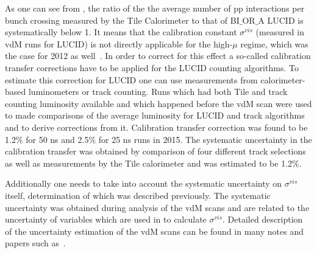 As one can see from , the ratio of the the average number of pp interactions per bunch crossing
measured by the Tile Calorimeter to that of BI$\_$OR$\_$A LUCID is systematically below 1. 
It means that the calibration constant $\sigma^{vis}$ (measured in vdM runs for LUCID) is not directly applicable for the high-$\mu$ regime, 
which was the case for 2012 as well~\cite{Aaboud:2016hhf}.
In order to correct for this effect a so-called calibration transfer corrections have to be applied for the LUCID counting algorithms.
To estimate this correction for LUCID one can use measurements from calorimeter-based luminometers or track counting.
Runs which had both Tile and track counting luminosity available and which happened before the vdM scan were used to made comparisons of the average luminosity for LUCID and track algorithms
and to derive corrections from it. Calibration transfer correction was found to be 1.2$\%$ for 50 ns and 2.5$\%$ for 25 ns runs in 2015.
The systematic uncertainty in the calibration transfer was obtained by comparison of four different track selections as well as measurements by the Tile calorimeter and was estimated to be 1.2$\%$.

Additionally one needs to take into account the systematic uncertainty on $\sigma^{vis}$ itself, determination of which was described previously.
The systematic uncertainty was obtained during analysis of the vdM scans and are related to the uncertainty of variables which are used in
 to calculate $\sigma^{vis}$. 
Detailed description of the uncertainty estimation of the vdM scans can be found in many notes and papers such 
as~\cite{ATLAS:2010uca,ATLAS-CONF-2011-011,ATLAS:2011cia,ATLAS:2012roa,Aad:2011dr,Aad:2013ucp,Aaboud:2016hhf}.


